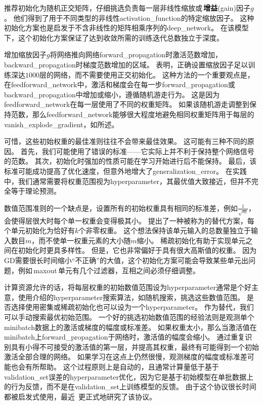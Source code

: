 \cite{Saxe-et-al-ICLR13}推荐初始化为随机正交矩阵，仔细挑选负责每一层非线性缩放或\,\textbf{增益}(gain)因子$g$。
他们得到了用于不同类型的非线性\gls{activation_function}的特定缩放因子。
这种初始化方案也是启发于不含非线性的矩阵相乘序列的\gls{deep_network}。
在该模型下，这个初始化方案保证了达到收敛所需的训练迭代总数独立于深度。


增加缩放因子$g$将网络推向网络\gls{forward_propagation}时激活范数增加，\gls{backward_propagation}时梯度范数增加的区域。
\cite{Sussillo14}表明，正确设置缩放因子足以训练深达$1000$层的网络，而不需要使用正交初始化。
这种方法的一个重要观点是，在\gls{feedforward_network}中，激活和梯度会在每一步\gls{forward_propagation}或\gls{backward_propagation}中增加或缩小，遵循随机游走行为。
这是因为\gls{feedforward_network}在每一层使用了不同的权重矩阵。
如果该随机游走调整到保持范数，那么\gls{feedforward_network}能够很大程度地避免相同权重矩阵用于每层的\gls{vanish_explode_gradient}，如所述。


可惜，这些初始权重的最佳准则往往不会带来最佳效果。
这可能有三种不同的原因。
首先，我们可能使用了错误的标准——它实际上并不利于保持整个网络信号的范数。
其次，初始化时强加的性质可能在学习开始进行后不能保持。
最后，该标准可能成功提高了优化速度，但意外地增大了\gls{generalization_error}。
在实践中，我们通常需要将权重范围视为\gls{hyperparameter}，其最优值大致接近，但并不完全等于理论预测。


数值范围准则的一个缺点是，设置所有的初始权重具有相同的标准差，例如$\frac{1}{\sqrt{m}}$，会使得层很大时每个单一权重会变得极其小。
\cite{martens2010hessian-small}提出了一种被称为的替代方案，每个单元初始化为恰好有$k$个非零权重。
这个想法保持该单元输入的总数量独立于输入数目$m$，而不使单一权重元素的大小随$m$缩小。
稀疏初始化有助于实现单元之间在初始化时更具多样性。
但是，它也非常偏好于具有很大高斯值的权重。
因为\gls{GD}需要很长时间缩小``不正确''的大值，这个初始化方案可能会导致某些单元出问题，例如\,\gls{maxout}\,单元有几个过滤器，互相之间必须仔细调整。


计算资源允许的话，将每层权重的初始数值范围设为\gls{hyperparameter}通常是个好主意，使用介绍的\gls{hyperparameter}搜索算法，如随机搜索，挑选这些数值范围。
是否选择使用密集或稀疏初始化也可以设为一个\gls{hyperparameter}。
作为替代，我们可以手动搜索最优初始范围。
一个好的挑选初始数值范围的经验法则是观测单个\gls{minibatch}数据上的激活或梯度的幅度或标准差。
如果权重太小，那么当激活值在\gls{minibatch}上\gls{forward_propagation}于网络时，激活值的幅度会缩小。
通过重复识别具有小得不可接受的激活值的第一层，并提高其权重，最终有可能得到一个初始激活全部合理的网络。
如果学习在这点上仍然很慢，观测梯度的幅度或标准差可能也会有所帮助。
这个过程原则上是自动的，且通常计算量低于基于\gls{validation_set}误差的\gls{hyperparameter}优化，因为它是基于初始模型在单批数据上的行为反馈，而不是在\gls{validation_set}上训练模型的反馈。
由于这个协议很长时间都被启发式使用，最近~\cite{mishkin2015all}更正式地研究了该协议。


